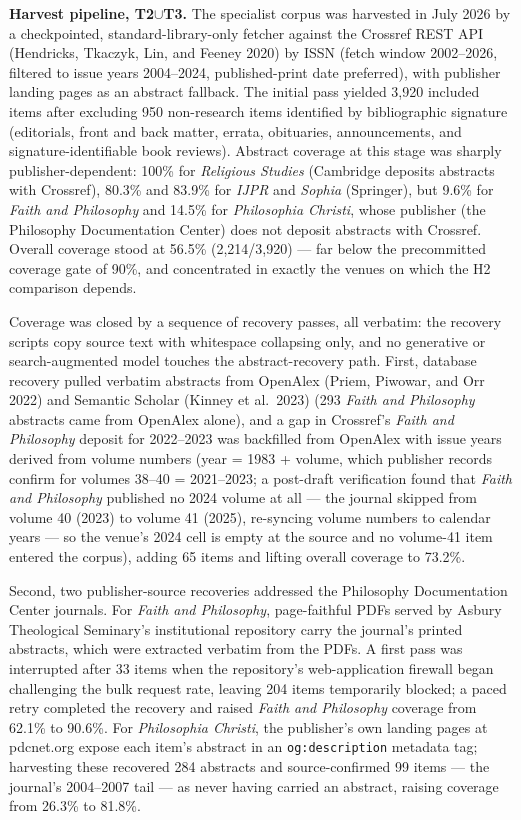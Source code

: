 \textbf{Harvest pipeline, T2$\cup$T3.} The specialist corpus was harvested in July 2026 by a checkpointed, standard-library-only fetcher against the Crossref REST API (Hendricks, Tkaczyk, Lin, and Feeney 2020) by ISSN (fetch window 2002--2026, filtered to issue years 2004--2024, published-print date preferred), with publisher landing pages as an abstract fallback. The initial pass yielded 3,920 included items after excluding 950 non-research items identified by bibliographic signature (editorials, front and back matter, errata, obituaries, announcements, and signature-identifiable book reviews). Abstract coverage at this stage was sharply publisher-dependent: 100\% for \emph{Religious Studies} (Cambridge deposits abstracts with Crossref), 80.3\% and 83.9\% for \emph{IJPR} and \emph{Sophia} (Springer), but 9.6\% for \emph{Faith and Philosophy} and 14.5\% for \emph{Philosophia Christi}, whose publisher (the Philosophy Documentation Center) does not deposit abstracts with Crossref. Overall coverage stood at 56.5\% (2,214/3,920) --- far below the precommitted coverage gate of 90\%, and concentrated in exactly the venues on which the H2 comparison depends.

Coverage was closed by a sequence of recovery passes, all verbatim: the recovery scripts copy source text with whitespace collapsing only, and no generative or search-augmented model touches the abstract-recovery path. First, database recovery pulled verbatim abstracts from OpenAlex (Priem, Piwowar, and Orr 2022) and Semantic Scholar (Kinney et al.~2023) (293 \emph{Faith and Philosophy} abstracts came from OpenAlex alone), and a gap in Crossref's \emph{Faith and Philosophy} deposit for 2022--2023 was backfilled from OpenAlex with issue years derived from volume numbers (year = 1983 + volume, which publisher records confirm for volumes 38--40 = 2021--2023; a post-draft verification found that \emph{Faith and Philosophy} published no 2024 volume at all --- the journal skipped from volume 40 (2023) to volume 41 (2025), re-syncing volume numbers to calendar years --- so the venue's 2024 cell is empty at the source and no volume-41 item entered the corpus), adding 65 items and lifting overall coverage to 73.2\%.

Second, two publisher-source recoveries addressed the Philosophy Documentation Center journals. For \emph{Faith and Philosophy}, page-faithful PDFs served by Asbury Theological Seminary's institutional repository carry the journal's printed abstracts, which were extracted verbatim from the PDFs. A first pass was interrupted after 33 items when the repository's web-application firewall began challenging the bulk request rate, leaving 204 items temporarily blocked; a paced retry completed the recovery and raised \emph{Faith and Philosophy} coverage from 62.1\% to 90.6\%. For \emph{Philosophia Christi}, the publisher's own landing pages at pdcnet.org expose each item's abstract in an \texttt{og:description} metadata tag; harvesting these recovered 284 abstracts and source-confirmed 99 items --- the journal's 2004--2007 tail --- as never having carried an abstract, raising coverage from 26.3\% to 81.8\%.

